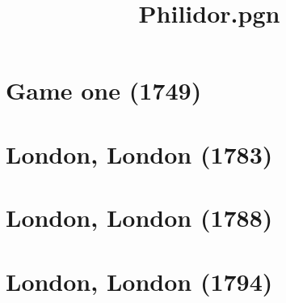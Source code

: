 \documentclass[11pt]{article}
\title{Philidor.pgn}
\newcommand*\cleartoleftpage{%
   \clearpage
   \ifodd\value{page}\hbox{}\newpage\fi
}
\begin{document}
\maketitle

\newpage

\tableofcontents
\newpage

\printindex

\cleartoleftpage
\section{Game one (1749)}


\cleartoleftpage

\section{London, London (1783)}


\cleartoleftpage

\section{London, London (1788)}


\cleartoleftpage

\section{London, London (1794)}


\cleartoleftpage



\cleartoleftpage



\cleartoleftpage
\end{document}
